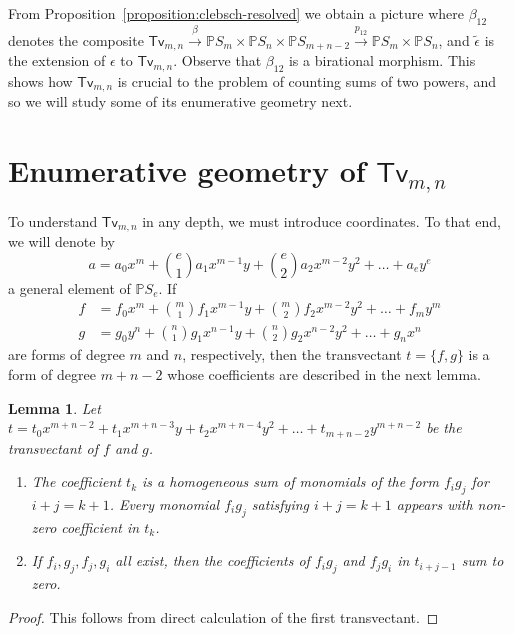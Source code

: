 \documentclass[12pt]{article}
\theoremstyle{plain}
\newtheorem{lemma}[theorem]{Lemma}
\theoremstyle{remark}
\renewcommand{\P}{\mathbb{P}}
\newcommand{\transvectant}{\mathsf{Tv}}
\begin{document}
From Proposition~\ref{proposition:clebsch-resolved} we obtain a picture where $\beta_{12}$ denotes the composite $\transvectant_{m,n} \xrightarrow{\beta} \P S_{m} \times \P S_{n} \times \P S_{m+n-2} \xrightarrow{p_{12}} \P S_{m} \times \P S_{n}$, and $\widetilde{\epsilon}$ is the extension of $\epsilon$ to $\transvectant_{m,n}$.  Observe that $\beta_{12}$ is a birational morphism.  This shows how $\transvectant_{m,n}$ is crucial to the problem of counting sums of two powers, and so we will study some of its enumerative geometry next.


\section{Enumerative geometry of $\transvectant_{m,n}$}

To understand $\transvectant_{m,n}$ in any depth, we must introduce coordinates.  To that end, we will denote by
\[
    a = a_{0}x^{m} + {e \choose 1} a_{1}x^{m-1}y + {e \choose 2} a_{2}x^{m-2}y^{2} + \dots + a_{e}y^{e}
\]
a general element of $\P S_{e}$.  If
\begin{align*}
f &= f_{0}x^{m} + {m \choose 1} f_{1}x^{m-1}y + {m \choose 2} f_{2}x^{m-2}y^{2} + \dots + f_{m}y^{m}\\
g &= g_{0}y^{n} + {n \choose 1} g_{1}x^{n-1}y + {n \choose 2} g_{2}x^{n-2}y^{2} + \dots + g_{n}x^{n}
\end{align*}
are forms of degree $m$ and $n$, respectively, then the transvectant $t = \{f,g\}$ is a form of degree $m+n-2$ whose coefficients are described in the next lemma.

\begin{lemma}
    \label{lemma:transvectantcoefficients}
    Let $t = t_{0}x^{m+n-2} +  t_{1}x^{m+n-3}y + t_{2}x^{m+n-4}y^{2} + \dots + t_{m+n-2}y^{m+n-2}$ be the transvectant of $f$ and $g$.
    \begin{enumerate}
        \item The coefficient $t_k$ is a homogeneous sum of monomials of the form $f_i g_j$ for $i+j = k+1$. Every monomial $f_i g_j$ satisfying $i+j = k+1$ appears with non-zero coefficient in $t_k$.
        \item If $f_i, g_j, f_j, g_i$ all exist, then the coefficients of $f_i g_j$ and $f_j g_i$ in $t_{i+j-1}$ sum to zero.
    \end{enumerate}
\end{lemma}

\begin{proof}
    \label{proof:transvectantcoefficients}
    This follows from direct calculation of the first transvectant.
\end{proof}
\end{document}
